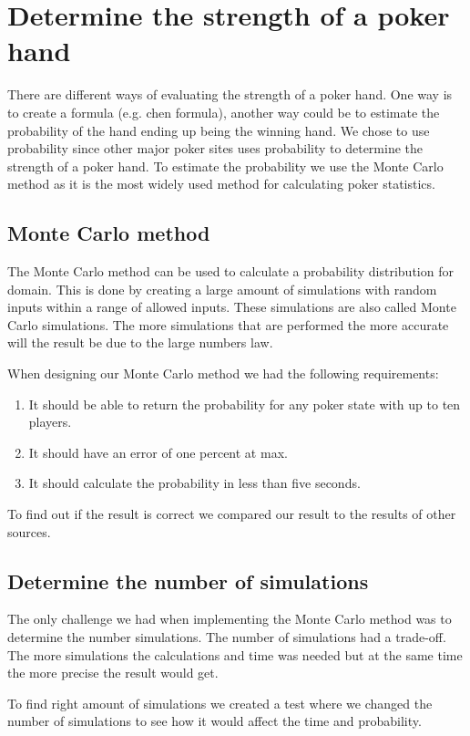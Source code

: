 \section{Determine the strength of a poker hand}
There are different ways of evaluating the strength of a poker hand. One way is to create a formula (e.g. chen formula), another way could be to estimate the  probability of the hand ending up being the winning hand. We chose to use probability since other major poker sites uses probability to determine the strength of a poker hand. To estimate the probability we use the Monte Carlo method as it is the most widely used method for calculating poker statistics. 

\subsection{Monte Carlo method}
The Monte Carlo method can be used to calculate a probability distribution for domain. This is done by creating a large amount of simulations with random inputs within a range of allowed inputs. These simulations are also called Monte Carlo simulations. The more simulations that are performed the more accurate will the result be due to the large numbers law. 

When designing our Monte Carlo method we had the following requirements:
\begin{enumerate}
\item It should be able to return the probability for any poker state with up to ten players.
\item It should have an error of one percent at max.
\item It should calculate the probability in less than five seconds.
\end{enumerate}

To find out if the result is correct we compared our result to the results of other sources.

\subsection{Determine the number of simulations}
The only challenge we had when implementing the Monte Carlo method was to determine the number simulations. The number of simulations had a trade-off. The more simulations the calculations and time was needed but at the same time the more precise the result would get. 

To find right amount of simulations we created a test where we changed the number of simulations to see how it would affect the time and probability.

